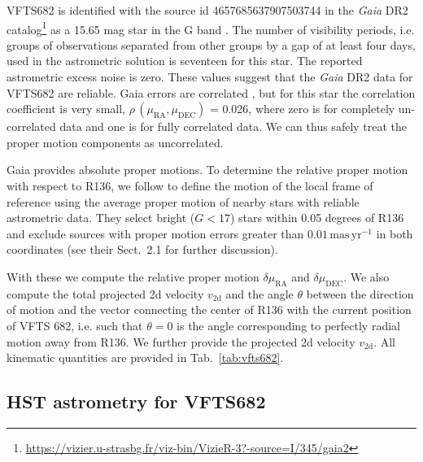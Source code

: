 \documentclass[apjl,twocolumn]{emulateapj}
\newcommand{\masyr}{\,\mathrm{mas}\,\mathrm{yr}^{-1}}
\begin{document}
VFTS682 is identified with the source id 4657685637907503744 in the
\emph{Gaia} DR2 catalog\footnote{\url{https://vizier.u-strasbg.fr/viz-bin/VizieR-3?-source=I/345/gaia2}}
  as a 15.65 mag star in the G band
\citep{gaia:16,brown:18}.   The number of visibility periods,
i.e. groups of observations separated from other groups by a gap of at
least four days, used in the astrometric solution is seventeen for this
star. The reported astrometric excess noise is zero.  These values
suggest that the \emph{Gaia} DR2  data for VFTS682 are
reliable. Gaia errors are correlated \citep[][]{lindengren:18}, but for this star the correlation coefficient is very small, $\rho\,(\mu_\mathrm{RA}, \mu_\mathrm{DEC})$  = 0.026, where zero is for completely un-correlated data and one is for fully correlated data. We can thus safely treat the proper motion components as uncorrelated.

Gaia provides absolute proper motions.  To determine the relative proper motion with respect to R136, we follow  \citet{lennon:18} to define the motion of the local frame of reference using the average proper motion of nearby stars with reliable astrometric data.  They select  bright ($G<17$) stars within 0.05 degrees of R136 and exclude sources with proper motion errors greater than $0.01\masyr$ in both coordinates (see their  Sect.~2.1 for further discussion).  

With these we compute the relative proper motion
$\delta\mu_\mathrm{RA}$ and $\delta\mu_\mathrm{DEC}$.   We also compute the total projected 2d velocity
$v_\mathrm{2d}$ and
the angle $\theta$ between the direction of motion and the vector
connecting the center of R136 with the current position of VFTS 682,
i.e. such that $\theta = 0$ is the angle corresponding to perfectly
radial motion away from R136.    We further provide the projected 2d velocity
$v_\mathrm{2d}$.   All kinematic quantities are provided in
Tab.~\ref{tab:vfts682}. 



\subsection{HST astrometry for VFTS682}
\end{document}
